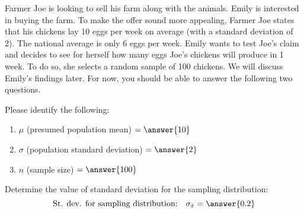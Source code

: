\documentclass{ximera}
\begin{document}
\begin{problem}\label{pr:farmerJoe}
Farmer Joe is looking to sell his farm along with the animals. Emily is interested in buying the farm. To make the offer sound more appealing, Farmer Joe states that his chickens lay 10 eggs per week on average (with a standard deviation of 2).  The national average is only 6 eggs per week. Emily wants to test Joe's claim and decides to see for herself how many eggs Joe's chickens will produce in 1 week. To do so, she selects a random sample of 100 chickens. We will discuss Emily's findings later.  For now, you should be able to answer the following two questions.

\begin{question}
Please identify the following:
 \begin{enumerate}
     \item $\mu$ (presumed population mean) $= \answer{10}$
     \item $\sigma$ (population standard deviation) $= \answer{2}$
     \item $n$ (sample size) $= \answer{100}$
\end{enumerate}
\end{question}

\begin{question}
Determine the value of standard deviation for the sampling distribution:
$$\mbox{St. dev. for sampling distribution:}\quad\sigma_{\bar{x}}= \answer{0.2}$$
\end{question}



\end{problem}
\end{document}

